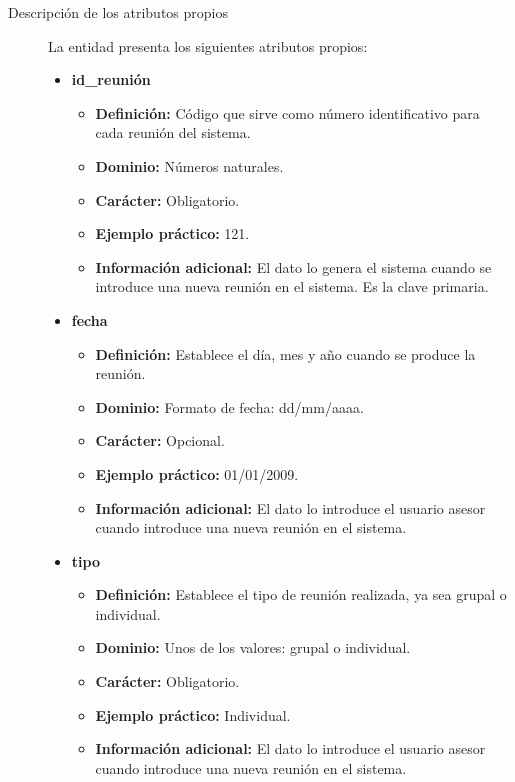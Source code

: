 \begin{description}
   \item[Descripción de los atributos propios] La entidad presenta los siguientes
   atributos propios:

   \begin{itemize}
    \item \textbf{id\_reunión}
      \begin{itemize}
         \item \textbf{Definición:} Código que sirve como número identificativo
               para cada reunión del sistema.
         \item \textbf{Dominio:} Números naturales.
         \item \textbf{Carácter:} Obligatorio.
         \item \textbf{Ejemplo práctico:} 121.
         \item \textbf{Información adicional:} El dato lo genera el sistema
               cuando se introduce una nueva reunión en el sistema. Es la clave
               primaria.
      \end{itemize}
   \item \textbf{fecha}
          \begin{itemize}
            \item \textbf{Definición:} Establece el día, mes y año cuando se
            produce la reunión.
            \item \textbf{Dominio:} Formato de fecha: dd/mm/aaaa.
            \item \textbf{Carácter:} Opcional.
            \item \textbf{Ejemplo práctico:} 01/01/2009.
            \item \textbf{Información adicional:} El dato lo introduce el
            usuario asesor cuando introduce una nueva reunión en el sistema.
         \end{itemize}
   \item \textbf{tipo}
          \begin{itemize}
            \item \textbf{Definición:} Establece el tipo de reunión realizada,
            ya sea grupal o individual.
            \item \textbf{Dominio:} Unos de los valores: grupal o individual.
            \item \textbf{Carácter:} Obligatorio.
            \item \textbf{Ejemplo práctico:} Individual.
            \item \textbf{Información adicional:} El dato lo introduce el
            usuario asesor cuando introduce una nueva reunión en el sistema.
         \end{itemize}
   \end{itemize}


\end{description}
